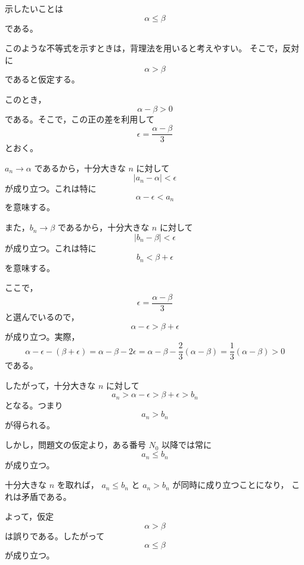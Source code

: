 \begin{strategy}
	示したいことは
	\[
		\alpha\leq \beta
	\]
	である。

	このような不等式を示すときは，背理法を用いると考えやすい。
	そこで，反対に
	\[
		\alpha>\beta
	\]
	であると仮定する。

	このとき，
	\[
		\alpha-\beta>0
	\]
	である。そこで，この正の差を利用して
	\[
		\epsilon=\frac{\alpha-\beta}{3}
	\]
	とおく。

	$a_n\to\alpha$ であるから，十分大きな $n$ に対して
	\[
		|a_n-\alpha|<\epsilon
	\]
	が成り立つ。これは特に
	\[
		\alpha-\epsilon<a_n
	\]
	を意味する。

	また，$b_n\to\beta$ であるから，十分大きな $n$ に対して
	\[
		|b_n-\beta|<\epsilon
	\]
	が成り立つ。これは特に
	\[
		b_n<\beta+\epsilon
	\]
	を意味する。

	ここで，
	\[
		\epsilon=\frac{\alpha-\beta}{3}
	\]
	と選んでいるので，
	\[
		\alpha-\epsilon
		>
		\beta+\epsilon
	\]
	が成り立つ。実際，
	\[
		\alpha-\epsilon-(\beta+\epsilon)
		=
		\alpha-\beta-2\epsilon
		=
		\alpha-\beta-\frac{2}{3}(\alpha-\beta)
		=
		\frac{1}{3}(\alpha-\beta)
		>0
	\]
	である。

	したがって，十分大きな $n$ に対して
	\[
		a_n>\alpha-\epsilon
		>
		\beta+\epsilon
		>b_n
	\]
	となる。つまり
	\[
		a_n>b_n
	\]
	が得られる。

	しかし，問題文の仮定より，ある番号 $N_0$ 以降では常に
	\[
		a_n\leq b_n
	\]
	が成り立つ。

	十分大きな $n$ を取れば，
	$a_n\leq b_n$ と $a_n>b_n$ が同時に成り立つことになり，
	これは矛盾である。

	よって，仮定
	\[
		\alpha>\beta
	\]
	は誤りである。したがって
	\[
		\alpha\leq\beta
	\]
	が成り立つ。
\end{strategy}